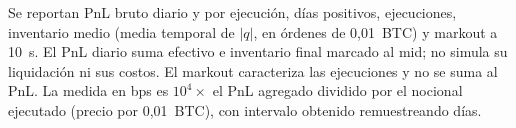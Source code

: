 Se reportan PnL bruto diario y por ejecución, días positivos, ejecuciones, inventario medio (media temporal de $|q|$, en órdenes de 0,01~BTC) y markout a 10~s. El PnL diario suma efectivo e inventario final marcado al mid; no simula su liquidación ni sus costos. El markout caracteriza las ejecuciones y no se suma al PnL. La medida en bps es $10^4\times$ el PnL agregado dividido por el nocional ejecutado (precio por 0,01~BTC), con intervalo obtenido remuestreando días.
